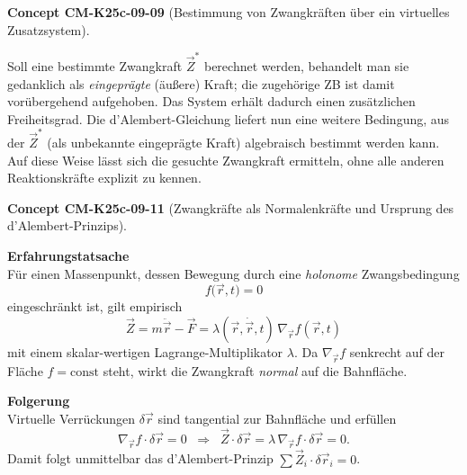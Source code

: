 \documentclass[10pt, letterpaper]{article}
\newcommand{\CustomHeading}[3]{%
  \par\medskip\noindent%
  \textbf{#1 #2} \textnormal{(#3)}.\enskip%
}
\newenvironment{CONC}[2]{\CustomHeading{Concept}{#1}{#2}}{}
\begin{document}
\begin{CONC}{CM-K25c-09-09}{Bestimmung von Zwangkräften über ein virtuelles Zusatz­system}
Soll eine bestimmte Zwangkraft $\vec Z^{\ast}$ berechnet werden, behandelt man sie gedanklich als
\emph{eingeprägte} (äußere) Kraft; die zugehörige ZB ist damit vorübergehend aufgehoben. Das System erhält dadurch einen zusätzlichen Freiheitsgrad. Die d’Alembert-Gleichung liefert nun eine weitere Bedingung, aus der $\vec Z^{\ast}$ (als unbekannte eingeprägte Kraft) algebraisch bestimmt werden kann. Auf diese Weise lässt sich die gesuchte Zwangkraft ermitteln, ohne alle anderen Reaktionskräfte explizit zu kennen.
\end{CONC}

\begin{CONC}{CM-K25c-09-11}{Zwangkräfte als Normalenkräfte und Ursprung des d’Alembert-Prinzips}
\textbf{Erfahrungstatsache}\\
Für einen Massenpunkt, dessen Bewegung durch eine \emph{holonome}
Zwangsbedingung
\[
  f\!\bigl(\vec r,t\bigr)=0
\]
eingeschränkt ist, gilt empirisch
\[
  \boxed{\;
    \vec Z = m\ddot{\vec r}-\vec F
    = \lambda(\vec r,\dot{\vec r},t)\,
      \nabla_{\!\vec r} f(\vec r,t)
  \;}
\]
mit einem skalar-wertigen Lagrange-Multiplikator $\lambda$.  
Da $\nabla_{\!\vec r}f$ senkrecht auf der Fläche $f=\text{const}$
steht, wirkt die Zwangkraft \emph{normal} auf die Bahnfläche.

\textbf{Folgerung}\\
Virtuelle Verrückungen $\delta\vec r$ sind tangential zur
Bahnfläche und erfüllen
\[
  \nabla_{\!\vec r} f\!\cdot\!\delta\vec r = 0
  \;\;\Longrightarrow\;\;
  \vec Z\!\cdot\!\delta\vec r
  = \lambda\,\nabla_{\!\vec r}f\!\cdot\!\delta\vec r = 0 .
\]
Damit folgt unmittelbar das d’Alembert-Prinzip
$\sum\vec Z_i\!\cdot\!\delta\vec r_i = 0$.
\end{CONC}
\end{document}
